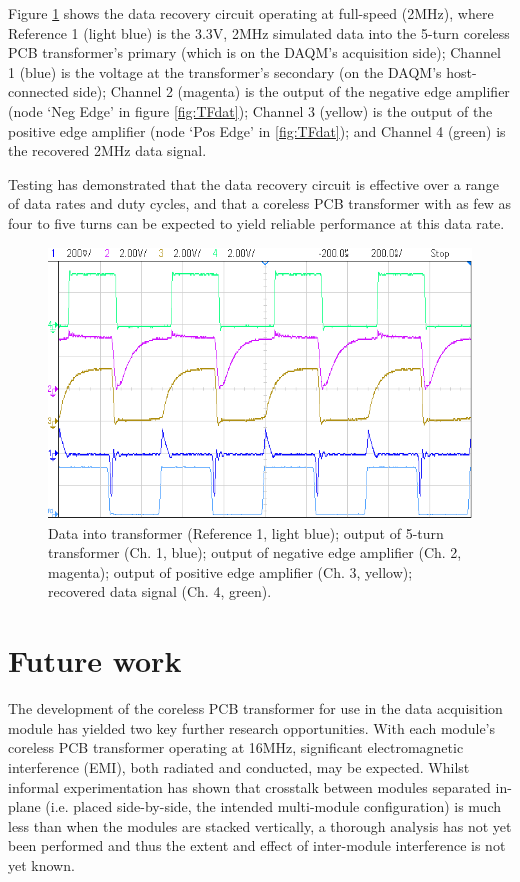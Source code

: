 \documentclass[conference]{IEEEtran}
\begin{document}
	Figure \ref{fig:Data} shows the data recovery circuit operating at full-speed (2MHz), where Reference 1 (light blue) is the 3.3V, 2MHz simulated data into the 5-turn coreless PCB transformer's primary (which is on the DAQM's acquisition side); Channel 1 (blue) is the voltage at the transformer's secondary (on the DAQM's host-connected side); Channel 2 (magenta) is the output of the negative edge amplifier (node `Neg Edge' in figure \ref{fig:TFdat}); Channel 3 (yellow) is the output of the positive edge amplifier (node `Pos Edge' in \ref{fig:TFdat}); and Channel 4 (green) is the recovered 2MHz data signal.
	
	Testing has demonstrated that the data recovery circuit is effective over a range of data rates and duty cycles, and that a coreless PCB transformer with as few as four to five turns can be expected to yield reliable performance at this data rate.
	
	\begin{figure}[t]
		\centering
		\includegraphics[width=1\columnwidth]{./img/2M_Cropped}
		\caption{Data into transformer (Reference 1, light blue); output of 5-turn transformer (Ch. 1, blue); output of negative edge amplifier (Ch. 2, magenta); output of positive edge amplifier (Ch. 3, yellow); recovered data signal (Ch. 4, green).}
		\label{fig:Data}
	\end{figure}

\section{Future work}
The development of the coreless PCB transformer for use in the data acquisition module has yielded two key further research opportunities.  
With each module's coreless PCB transformer operating at 16MHz, significant electromagnetic interference (EMI), both radiated and conducted, may be expected.  Whilst informal experimentation has shown that crosstalk between modules separated in-plane (i.e. placed side-by-side, the intended multi-module configuration) is much less than when the modules are stacked vertically, a thorough analysis has not yet been performed and thus the extent and effect of inter-module interference is not yet known.  
\end{document}
